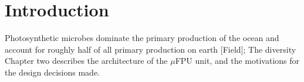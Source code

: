 \chapter{Introduction}

Photosynthetic microbes dominate the primary production of the ocean and account for roughly half of all primary production on earth [Field]; The diversity 
Chapter two describes the architecture of the $\mu$FPU unit, and the
motivations for the design decisions made.





